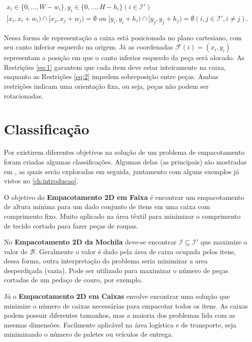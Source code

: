 \begin{align}
    x_i \in \{0, \dots, W - w_i\}, y_i \in \{0, \dots, H - h_i\} (i \in \mathcal{I}') \label{eq:1} \\
    [x_i, x_i + w_i) \cap [x_j, x_j + w_j) = \emptyset \text{ ou } [y_i, y_i + h_i) \cap [y_j, y_j + h_j) = \emptyset (i, j \in \mathcal{I}', i \neq j) \label{eq:2}.
\end{align}

Nessa forma de representação a caixa está posicionada no plano cartesiano, com seu canto inferior esquerdo na origem.
Já as coordenadas $\mathcal{F}(i) = (x_i, y_i)$ representam a posição em que o canto inferior esquerdo da peça será alocado.
As Restrições \ref{eq:1} garantem que cada item deve estar inteiramente na caixa, enquanto as Restrições \ref{eq:2} impedem sobreposição entre peças.
Ambas restrições indicam uma orientação fixa, ou seja, peças não podem ser rotacionadas.


\section{Classificação}\label{sec:classificacao}

Por existirem diferentes objetivos na solução de um problema de empacotamento foram criadas algumas classificações.
Algumas delas (as principais) são mostradas em \cite{exact-solution-techniques}, as quais serão exploradas em seguida, juntamento com alguns exemplos já vistos no \autoref{ch:introducao}.

O objetivo do \textbf{Empacotamento 2D em Faixa} é encontrar um empacotamento de altura mínima para um dado conjunto de itens em uma caixa com comprimento fixo.
Muito aplicado na área têxtil para minimizar o comprimento de tecido cortado para fazer peças de roupas.

No \textbf{Empacotamento 2D da Mochila} deve-se encontrar $\mathcal{I} \subseteq \mathcal{I}'$ que maximize o valor de $\mathcal{B}$.
Geralmente o valor é dado pela área de caixa ocupada pelos itens, dessa forma, outra interpretação do problema seria minimizar a area desperdiçada (vazia).
Pode ser utilizado para maximizar o número de peças cortadas de um pedaço de couro, por exemplo.

Já o \textbf{Empacotamento 2D em Caixas} envolve encontrar uma solução que minimize o número de caixas necessárias para empacotar todos os itens.
As caixas podem possuir diferentes tamanhos, mas a maioria dos problemas lida com as mesmas dimensões.
Facilmente aplicável na área logística e de transporte, seja minimizando o número de paletes ou veículos de entrega.

